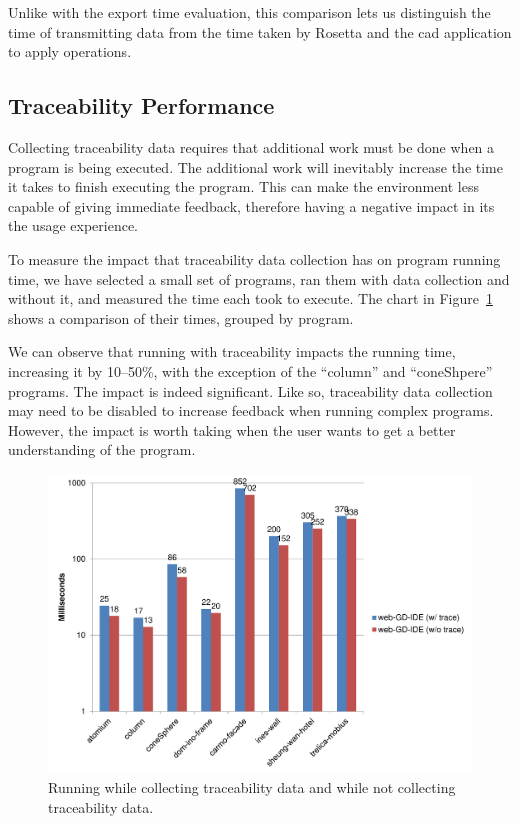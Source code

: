 Unlike with the export time evaluation, this comparison lets us distinguish the time of transmitting data from the time taken by Rosetta and the \gls{cad} application to apply operations.


\subsection{Traceability Performance}
Collecting traceability data requires that additional work must be done when a program is being executed.
The additional work will inevitably increase the time it takes to finish executing the program.
This can make the environment less capable of giving immediate feedback, therefore having a negative impact in its the usage experience.

To measure the impact that traceability data collection has on program running time, we have selected a small set of programs, ran them with data collection and without it, and measured the time each took to execute.
The chart in Figure~\ref{fig:traceability:timing} shows a comparison of their times, grouped by program.

We can observe that running with traceability impacts the running time, increasing it by 10--50\%, with the exception of the ``column'' and ``coneShpere'' programs.
The impact is indeed significant.
Like so, traceability data collection may need to be disabled to increase feedback when running complex programs.
However, the impact is worth taking when the user wants to get a better understanding of the program.

\begin{figure}
  \centering
  \includegraphics[width=1.0\textwidth]{./images/traceability_timing}
  \caption{Running while collecting traceability data and while not collecting traceability data.}
  \label{fig:traceability:timing}
\end{figure}





